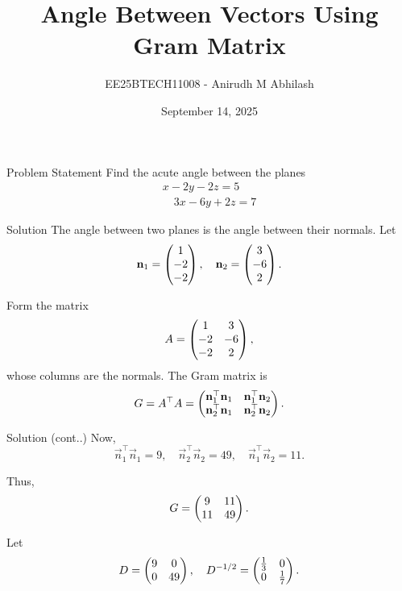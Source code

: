 \documentclass{beamer}
\title{Angle Between Vectors Using Gram Matrix}
\author{EE25BTECH11008 - Anirudh M Abhilash}
\date{September 14, 2025}
\begin{document}
\begin{frame}
\titlepage
\end{frame}

\begin{frame}{Problem Statement}
Find the acute angle between the planes 
\begin{align*}
x - 2y - 2z = 5 \\
\quad 3x - 6y + 2z = 7
\end{align*}
\end{frame}

\begin{frame}{Solution}
The angle between two planes is the angle between their normals.
Let
\[
\mathbf{n}_1 = \begin{pmatrix}1 \\ -2 \\ -2\end{pmatrix}, 
\quad \mathbf{n}_2 = \begin{pmatrix}3 \\ -6 \\ 2\end{pmatrix}.
\]

Form the matrix\
\begin{align}
A = \begin{pmatrix}1 & 3 \\ -2 & -6 \\ -2 & 2\end{pmatrix},
\end{align}
whose columns are the normals.  
The Gram matrix is
\begin{align}
G = A^\top A 
= \begin{pmatrix}\mathbf{n}_1^\top \mathbf{n}_1 & \mathbf{n}_1^\top \mathbf{n}_2 \\ \mathbf{n}_2^\top \mathbf{n}_1 & \mathbf{n}_2^\top \mathbf{n}_2\end{pmatrix}.
\end{align}
\end{frame}

\begin{frame}{Solution (cont..)}
Now,
\[
\vec{n}_1^\top \vec{n}_1 = 9, \quad 
\vec{n}_2^\top \vec{n}_2 = 49, \quad 
\vec{n}_1^\top \vec{n}_2 = 11.
\]

Thus,
\begin{align}
G = \begin{pmatrix}9 & 11 \\ 11 & 49\end{pmatrix}.
\end{align}


Let
\begin{align}
D = \begin{pmatrix}9 & 0 \\ 0 & 49\end{pmatrix}, 
\quad D^{-1/2} = \begin{pmatrix}\tfrac{1}{3} & 0 \\ 0 & \tfrac{1}{7}\end{pmatrix}.
\end{align}
\end{frame}
\end{document}

